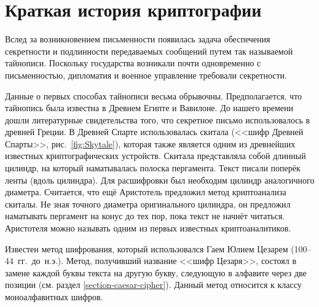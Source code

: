 \section{Краткая история криптографии}

Вслед за возникновением письменности появилась задача обеспечения секретности и подлинности передаваемых сообщений путем так называемой тайнописи. Поскольку государства возникали почти одновременно с письменностью, дипломатия и военное управление требовали секретности.

Данные о первых способах тайнописи весьма обрывочны. Предполагается, что тайнопись была известна в Древнем Египте и Вавилоне. До нашего времени дошли литературные свидетельства того, что секретное письмо использовалось в древней Греции. В Древней Спарте использовалась скитала (<<шифр Древней Спарты>>, рис.~\ref{fig:Skytale}), которая также является одним из древнейших известных криптографических устройств. Скитала представляла собой длинный цилиндр, на который наматывалась полоска пергамента. Текст писали поперёк ленты (вдоль цилиндра). Для расшифровки был необходим цилиндр аналогичного диаметра. Считается, что ещё Аристотель предложил метод криптоанализа скиталы. Не зная точного диаметра оригинального цилиндра, он предложил наматывать пергамент на конус до тех пор, пока текст не начнёт читаться. Аристотеля можно называть одним из первых известных криптоаналитиков.

Известен метод шифрования, который использовался Гаем Юлием Цезарем (100--44~гг.~до~н.э.). Метод, получивший название <<шифр Цезаря>>, состоял в замене каждой буквы текста на другую букву, следующую в алфавите через две позиции (см. раздел \ref{section-caesar-cipher}). Данный метод относится к классу моноалфавитных шифров.

